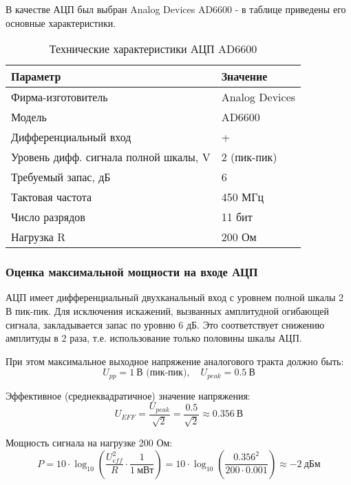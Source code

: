 \documentclass[a4paper,12pt]{article}
\begin{document}
В качестве АЦП был выбран Analog Devices AD6600 - в таблице приведены его основные характеристики.

\begin{table}[H]
\centering
\caption{Технические характеристики АЦП AD6600}
\begin{tabular}{|l|l|}
\hline
\textbf{Параметр} & \textbf{Значение} \\ \hline
Фирма-изготовитель & Analog Devices \\ \hline
Модель & AD6600 \\ \hline
Дифференциальный вход & + \\ \hline
Уровень дифф. сигнала полной шкалы, V & 2 (пик-пик) \\ \hline
Требуемый запас, дБ & 6 \\  \hline
Тактовая частота & 450 МГц  \\ \hline
Число разрядов & 11 бит \\ \hline
Нагрузка R & 200 Ом \\ \hline
\end{tabular}
\end{table}

\subsubsection{Оценка максимальной мощности на входе АЦП}
АЦП имеет дифференциальный двухканальный вход с уровнем полной шкалы 2 В пик-пик. Для исключения искажений, вызванных амплитудной огибающей сигнала, закладывается запас по уровню 6 дБ. Это соответствует снижению амплитуды в 2 раза, т.е. использование только половины шкалы АЦП.

При этом максимальное выходное напряжение аналогового тракта должно быть:
\begin{equation}
U_{pp} = 1\ \text{В (пик-пик)},\quad U_{peak} = 0.5\ \text{В}
\end{equation}

Эффективное (среднеквадратичное) значение напряжения:
\begin{equation}
    U_{EFF} = \frac{U_{peak}}{\sqrt{2}} = \frac{0.5}{\sqrt{2}} \approx 0.356\ \text{В}
\end{equation}

Мощность сигнала на нагрузке 200 Ом:
\begin{equation}
P = 10 \cdot \log_{10} \left( \frac{U_{eff}^2}{R} \cdot \frac{1}{1~\text{мВт}} \right)
= 10 \cdot \log_{10} \left( \frac{0.356^2}{200 \cdot 0.001} \right) \approx -2\ \text{дБм}
\end{equation}
\end{document}
